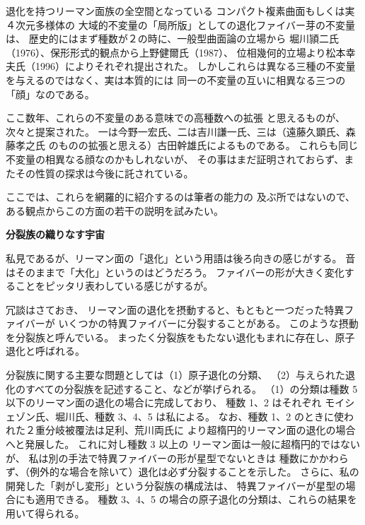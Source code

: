 \documentclass[uplatex,dvipdfmx]{jlreq}
\begin{document}
\bigskip

退化を持つリーマン面族の全空間となっている
コンパクト複素曲面もしくは実４次元多様体の
大域的不変量の「局所版」としての退化ファイバー芽の不変量は、
歴史的にはまず種数が２の時に、一般型曲面論の立場から
堀川頴二氏（1976）、保形形式的観点から上野健爾氏（1987）、
位相幾何的立場より松本幸夫氏（1996）によりそれぞれ提出された。
しかしこれらは異なる三種の不変量を与えるのではなく、実は本質的には
同一の不変量の互いに相異なる三つの「顔」なのである。

ここ数年、これらの不変量のある意味での高種数への拡張
と思えるものが、次々と提案された。
一は今野一宏氏、二は吉川謙一氏、三は（遠藤久顕氏、森藤孝之氏
のものの拡張と思える）古田幹雄氏によるものである。
これらも同じ不変量の相異なる顔なのかもしれないが、
その事はまだ証明されておらず、またその性質の探求は今後に託されている。

ここでは、これらを網羅的に紹介するのは筆者の能力の
及ぶ所ではないので、ある観点からこの方面の若干の説明を試みたい。

\newpage

\begin{center}
{\Large\bfseries 分裂族の織りなす宇宙}

\hspace*{\fill}{\large\bfseries 高村 茂（京大・理）}
\end{center}

\bigskip

私見であるが、リーマン面の「退化」という用語は後ろ向きの感じがする。
音はそのままで「大化」というのはどうだろう。
ファイバーの形が大きく変化することをピッタリ表わしている感じがするが。

冗談はさておき、
リーマン面の退化を摂動すると、もともと一つだった特異ファイバーが
いくつかの特異ファイバーに分裂することがある。
このような摂動を分裂族と呼んでいる。
まったく分裂族をもたない退化もまれに存在し、原子退化と呼ばれる。

分裂族に関する主要な問題としては（1）原子退化の分類、
（2）与えられた退化のすべての分裂族を記述すること、などが挙げられる。
（1）の分類は種数 5 以下のリーマン面の退化の場合に完成しており、
種数 1、2 はそれぞれ
モイシェゾン氏、堀川氏、種数 3、4、5 は私による。
なお、種数 1、2 のときに使われた２重分岐被覆法は足利、荒川両氏に
より超楕円的リーマン面の退化の場合へと発展した。
これに対し種数 3 以上の
リーマン面は一般に超楕円的ではないが、
私は別の手法で特異ファイバーの形が星型でないときは
種数にかかわらず、（例外的な場合を除いて）退化は必ず分裂することを示した。
さらに、私の開発した「剥がし変形」という分裂族の構成法は、
特異ファイバーが星型の場合にも適用できる。
種数 3、4、5 の場合の原子退化の分類は、これらの結果を用いて得られる。
\end{document}
